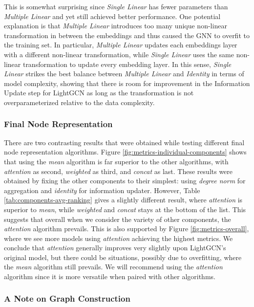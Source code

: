 \documentclass{article}
\begin{document}
This is somewhat surprising since \textit{Single Linear} has fewer parameters than \textit{Multiple Linear} and yet still achieved better performance. One potential explanation is that \textit{Multiple Linear} introduces too many unique non-linear transformation in between the embeddings and thus caused the GNN to overfit to the training set. In particular, \textit{Multiple Linear} updates each embeddings layer with a different non-linear transformation, while \textit{Single Linear} uses the same non-linear transformation to update every embedding layer. In this sense, \textit{Single Linear} strikes the best balance between \textit{Multiple Linear} and \textit{Identity} in terms of model complexity, showing that there is room for improvement in the Information Update step for LightGCN as long as the transformation is not overparameterized relative to the data complexity.


\subsubsection{Final Node Representation} \label{final-node-repr-discussion}

There are two contrasting results that were obtained while testing different final node representation algorithms. Figure \ref{fig:metrics-individual-components} shows that using the \textit{mean} algorithm is far superior to the other algorithms, with \textit{attention} as second, \textit{weighted} as third, and \textit{concat} as last. These results were obtained by fixing the other components to their simplest: using \textit{degree norm} for aggregation and \textit{identity} for information updater. However, Table \ref{tab:components-avg-ranking} gives a slightly different result, where \textit{attention} is superior to \textit{mean}, while \textit{weighted} and \textit{concat} stays at the bottom of the list. This suggests that overall when we consider the variety of other components, the \textit{attention} algorithm prevails. This is also supported by Figure \ref{fig:metrics-overall}, where we see more models using \textit{attention} achieving the highest metrics. We conclude that \textit{attention} generally improves very slightly upon LightGCN's original model, but there could be situations, possibly due to overfitting, where the \textit{mean} algorithm still prevails. We will recommend using the \textit{attention} algorithm since it is more versatile when paired with other algorithms.


\subsubsection{A Note on Graph Construction}
\end{document}
